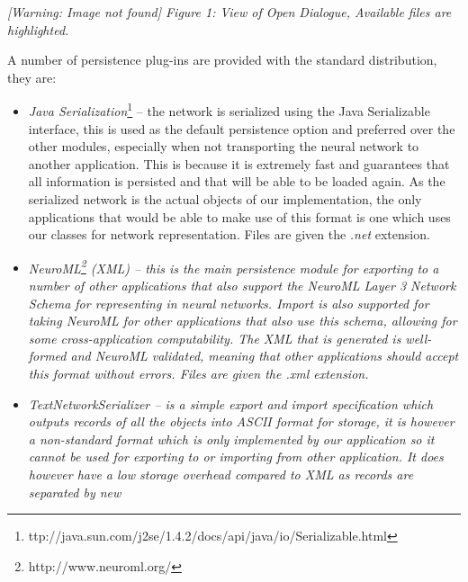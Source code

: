\documentclass[12pt,twoside]{article}
\newcommand\liststyleLi{%
\renewcommand\labelitemi{{\textbullet}}
\renewcommand\labelitemii{${\circ}$}
\renewcommand\labelitemiii{${\blacksquare}$}
\renewcommand\labelitemiv{{\textbullet}}
}
\begin{document}
{\mdseries\upshape
}

\begin{center}
\begin{minipage}{10cm}
{\raggedleft\itshape
 [Warning: Image not found] Figure 1: View of Open Dialogue, Available
files are highlighted.
\par}
\end{minipage}\end{center}
{\mdseries\upshape
A number of persistence plug{}-ins are provided with the standard
distribution, they are:}

\liststyleLi
\begin{itemize}
\item \textmd{\textit{Java
Serialization}}\footnote{ttp://java.sun.com/j2se/1.4.2/docs/api/java/io/Serializable.html}\textmd{\textup{
{--} the network is serialized using the Java Serializable interface,
this is used as the default persistence option and preferred over the
other modules, especially when not transporting the neural network to
another application. This is because it is extremely fast and
guarantees that all information is persisted and that will be able to
be loaded again. As the serialized network is the actual objects of our
implementation, the only applications that would be able to make use of
this format is one which uses our classes for network representation.
Files are given the }}\textmd{\textit{.net}}\textmd{\textup{
extension.}}
\item {\itshape
\textmd{NeuroML}\footnote{http://www.neuroml.org/}\textmd{
(XML)}\textmd{\textup{ {--} this is the main persistence module for
exporting to a number of other applications that also support the
NeuroML Layer 3 Network Schema for representing in neural networks.
Import is also supported for taking NeuroML for other applications that
also use this schema, allowing for some cross{}-application
computability. The XML that is generated is well{}-formed and NeuroML
validated, meaning that other applications should accept this format
without errors. Files are given the }}\textmd{.xml}\textmd{\textup{
extension.}}}
\item {\itshape
\textmd{TextNetworkSerializer}\textmd{\textup{ {--} is a simple export
and import specification which outputs records of all the objects into
ASCII format for storage, it is however a non{}-standard format which
is only implemented by our application so it cannot be used for
exporting to or importing from other application. It does however have
a low storage overhead compared to XML as records are separated by new
}}}
\end{itemize}
\end{document}
